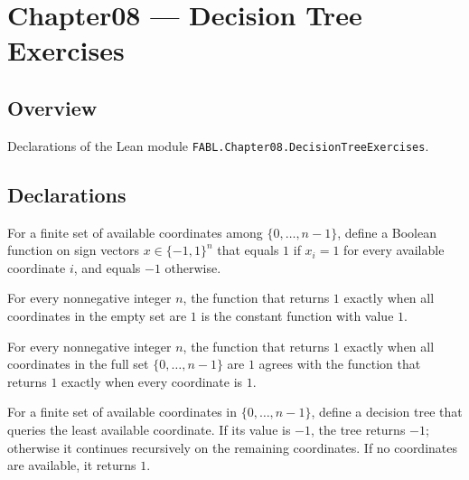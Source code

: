 \chapter{Chapter08 — Decision Tree Exercises}
\section{Overview}

Declarations of the Lean module \texttt{FABL.Chapter08.DecisionTreeExercises}.

\section{Declarations}

\begin{definition}
\label{FABL.orOnCoordinates}
\leanok
{}
For a finite set of available coordinates among $\{0,\ldots,n-1\}$, define a Boolean
function on sign vectors $x\in\{-1,1\}^n$ that equals $1$ if $x_i=1$ for every available
coordinate $i$, and equals $-1$ otherwise.
\end{definition}

\begin{theorem}
\label{FABL.orOnCoordinates_empty}
\leanok
{}
For every nonnegative integer $n$, the function that returns $1$ exactly when all
coordinates in the empty set are $1$ is the constant function with value $1$.
\end{theorem}

\begin{theorem}
\label{FABL.orOnCoordinates_univ}
\leanok
{}
For every nonnegative integer $n$, the function that returns $1$ exactly when all
coordinates in the full set $\{0,\ldots,n-1\}$ are $1$ agrees with the function that
returns $1$ exactly when every coordinate is $1$.
\end{theorem}

\begin{definition}
\label{FABL.sequentialOrTreeAux}
\leanok
{}
For a finite set of available coordinates in $\{0,\ldots,n-1\}$, define a decision
tree that queries the least available coordinate. If its value is $-1$, the tree returns
$-1$; otherwise it continues recursively on the remaining coordinates. If no coordinates
are available, it returns $1$.
\end{definition}

